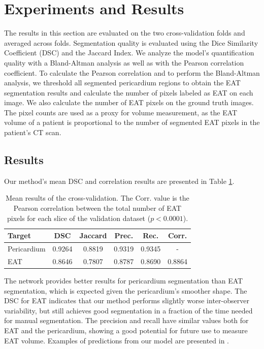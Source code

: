 \section{Experiments and Results}\label{experiment}

The results in this section are evaluated on the two cross-validation folds and averaged across folds. Segmentation quality is evaluated using the Dice Similarity Coefficient (DSC) and the Jaccard Index. We analyze the model's quantification quality with a Bland-Altman analysis \cite{MARTINBLAND1986307} as well as with the Pearson correlation coefficient. To calculate the Pearson correlation and to perform the Bland-Altman analysis, we threshold all segmented pericardium regions to obtain the EAT segmentation results and calculate the number of pixels labeled as EAT on each image. We also calculate the number of EAT pixels on the ground truth images. The pixel counts are used as a proxy for volume measurement, as the EAT volume of a patient is proportional to the number of segmented EAT pixels in the patient's CT scan.

\subsection{Results}

Our method's mean DSC and correlation results are presented in Table \ref{tab:results}. 

\begin{table}[b!]
\renewcommand{\arraystretch}{1.4}
\caption{Mean results of the cross-validation. The Corr. value is the Pearson correlation between the total number of EAT pixels for each slice of the validation dataset ($p<0.0001$).}
\centering
\begin{tabularx}{\textwidth}{Xccccc} 
 Target & DSC & Jaccard & Prec. & Rec. & Corr. \\
 \hline
 Pericardium & 0.9264 & 0.8819 & 0.9319 & 0.9345 & - \\ 
 EAT & 0.8646 & 0.7807 & 0.8787 & 0.8690 & 0.8864 \\
\end{tabularx}
\label{tab:results}
\end{table}

The network provides better results for pericardium segmentation than EAT segmentation, which is expected given the pericardium's smoother shape. The DSC for EAT indicates that our method performs slightly worse inter-observer variability, but still achieves good segmentation in a fraction of the time needed for manual segmentation. The precision and recall have similar values both for EAT and the pericardium, showing a good potential for future use to measure EAT volume. Examples of predictions from our model are presented in .

